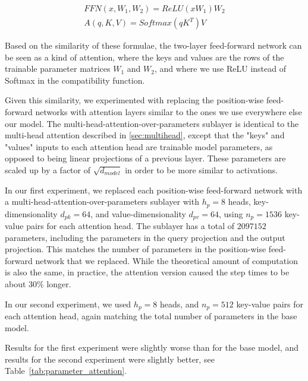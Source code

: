 \documentclass{article}
\begin{document}
\begin{align*}
    FFN(x, W_1, W_2) = ReLU(xW_1)W_2 \\
    A(q, K, V) = Softmax(qK^T)V
\end{align*}

Based on the similarity of these formulae, the two-layer feed-forward network can be seen as a kind of attention, where the keys and values are the rows of the trainable parameter matrices $W_1$ and $W_2$, and where we use ReLU instead of Softmax in the compatibility function.

Given this similarity, we experimented with replacing the position-wise feed-forward networks with attention layers similar to the ones we use everywhere else our model. The multi-head-attention-over-parameters sublayer is identical to the multi-head attention described in \ref{sec:multihead}, except that the "keys" and "values" inputs to each attention head are trainable model parameters, as opposed to being linear projections of a previous layer.  These parameters are scaled up by a factor of $\sqrt{d_{model}}$ in order to be more similar to activations.

In our first experiment, we replaced each position-wise feed-forward network with a multi-head-attention-over-parameters sublayer with $h_p=8$ heads, key-dimensionality $d_{pk}=64$, and value-dimensionality $d_{pv}=64$, using $n_p=1536$ key-value pairs for each attention head.  The sublayer has a total of $2097152$ parameters, including the parameters in the query projection and the output projection.  This matches the number of parameters in the position-wise feed-forward network that we replaced.  While the theoretical amount of computation is also the same, in practice, the attention version caused the step times to be about 30\% longer.

In our second experiment, we used $h_p=8$ heads, and $n_p=512$ key-value pairs for each attention head, again matching the total number of parameters in the base model.

Results for the first experiment were slightly worse than for the base model, and results for the second experiment were slightly better, see Table~\ref{tab:parameter_attention}.
\end{document}
